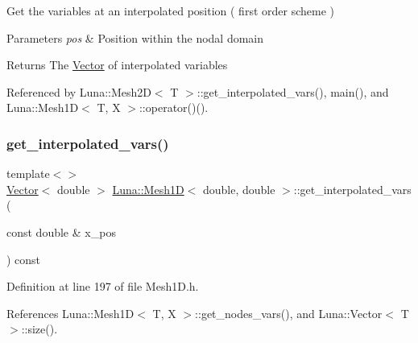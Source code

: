 Get the variables at an interpolated position ( first order scheme ) 


\begin{DoxyParams}{Parameters}
{\em pos} & Position within the nodal domain \\
\hline
\end{DoxyParams}
\begin{DoxyReturn}{Returns}
The \hyperlink{classLuna_1_1Vector}{Vector} of interpolated variables 
\end{DoxyReturn}


Referenced by Luna\+::\+Mesh2\+D$<$ T $>$\+::get\+\_\+interpolated\+\_\+vars(), main(), and Luna\+::\+Mesh1\+D$<$ T, X $>$\+::operator()().

\mbox{\label{classLuna_1_1Mesh1D_a0e248d3566778b329594a921398205f1}} 
\subsubsection{\texorpdfstring{get\+\_\+interpolated\+\_\+vars()}{get\_interpolated\_vars()}\hspace{0.1cm}{\footnotesize\ttfamily [2/4]}}
{\footnotesize\ttfamily template$<$$>$ \\
\hyperlink{classLuna_1_1Vector}{Vector}$<$ double $>$ \hyperlink{classLuna_1_1Mesh1D}{Luna\+::\+Mesh1D}$<$ double, double $>$\+::get\+\_\+interpolated\+\_\+vars (\begin{DoxyParamCaption}\item[{const double \&}]{x\+\_\+pos }\end{DoxyParamCaption}) const\hspace{0.3cm}{\ttfamily [inline]}}



Definition at line 197 of file Mesh1\+D.\+h.



References Luna\+::\+Mesh1\+D$<$ T, X $>$\+::get\+\_\+nodes\+\_\+vars(), and Luna\+::\+Vector$<$ T $>$\+::size().


